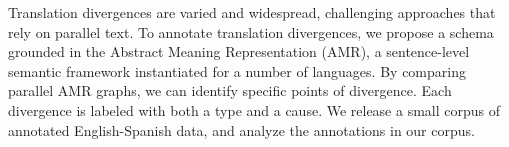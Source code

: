 Translation divergences are varied and widespread, challenging approaches that rely on parallel text. To annotate translation divergences, we propose a schema grounded in the Abstract Meaning Representation (AMR), a sentence-level semantic framework instantiated for a number of languages. By comparing parallel AMR graphs, we can identify specific points of divergence. Each divergence is labeled with both a type and a cause. We release a small corpus of annotated English-Spanish data, and analyze the annotations in our corpus.
